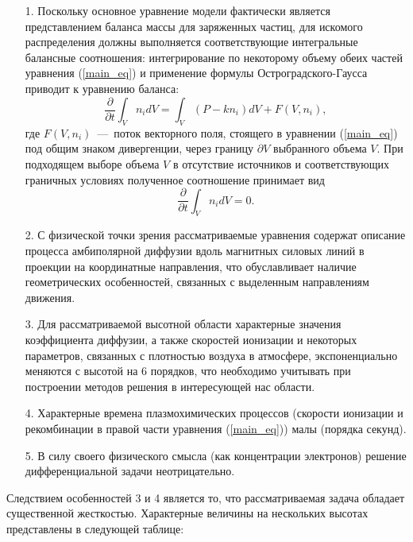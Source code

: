 \documentclass[14pt, a4paper]{extarticle}
\begin{document}
\begin{itemize}
\item[1.] Поскольку основное уравнение модели фактически является представлением баланса массы для заряженных частиц, для искомого распределения должны выполняется соответствующие интегральные балансные соотношения: интегрирование по некоторому объему обеих частей уравнения (\ref{main_eq}) и применение формулы Остроградского-Гаусса приводит к уравнению баланса: \begin{equation}\dfrac{\partial}{\partial t}\int_V n_i dV = \int_V (P-k n_i) dV + F(V, n_i),\end{equation} где $F(V, n_i)$~---~поток векторного поля, стоящего в уравнении (\ref{main_eq}) под общим знаком дивергенции, через границу $\partial V$ выбранного объема $V$. При подходящем выборе объема $V$ в отсутствие источников и соответствующих граничных условиях полученное соотношение принимает вид \begin{equation}\dfrac{\partial}{\partial t}\int_V n_i dV = 0.\end{equation}

\item[2.] С физической точки зрения рассматриваемые уравнения содержат описание процесса амбиполярной диффузии вдоль магнитных силовых линий в проекции на координатные направления, что обуславливает наличие геометрических особенностей, связанных с выделенным направлениям движения.

\item[3.] Для рассматриваемой высотной области характерные значения коэффициента диффузии, а также скоростей ионизации и некоторых параметров, связанных с плотностью воздуха в атмосфере, экспоненциально меняются с высотой на 6 порядков, что необходимо учитывать при построении методов решения в интересующей нас области.

\item[4.] Характерные времена плазмохимических процессов (скорости ионизации и рекомбинации в правой части уравнения (\ref{main_eq})) малы (порядка секунд).

\item[5.] В силу своего физического смысла (как концентрации электронов) решение дифференциальной задачи неотрицательно. 

\end{itemize}

Следствием особенностей 3 и 4 является то, что рассматриваемая задача обладает существенной жесткостью. Характерные величины на нескольких высотах представлены в следующей таблице: 
\end{document}
